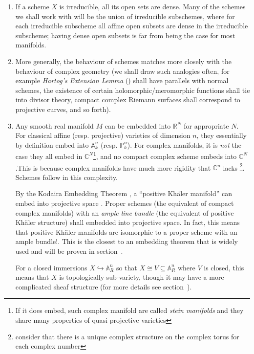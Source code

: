 \documentclass{article}
\newcommand{\A}{{\mathbb{A}}}
\newcommand{\C}{{\mathbb{C}}}
\newcommand{\R}{{\mathbb{R}}}
\renewcommand{\P}{{\mathbb{P}}}
\newcommand{\sse}{\subseteq}
\begin{document}
\begin{enumerate}
			would always be finite! However, there will still be a meaningful way to create the topology on
			$\A_k^n$ via $\A_k^1$ by taking the \emph{fibered product}
	\item If a scheme $X$ is irreducible, all its open sets are dense. Many of the schemes we shall work with
		will be the union of irreducible subschemes, where for each irreducible subscheme all affine open subsets are dense
		in the irreducible subscheme; having dense open subsets is far from being the case for most manifolds.
	\item More generally, the behaviour of schemes matches more closely with the behaviour of complex geometry
		(we shall draw such analogies often, for example \emph{Hartog's Extension Lemma}
		(\cite[chapter~8]{NateComplexAnalysis}) shall have parallels with normal schemes, the existence of certain
		holomorphic/meromorphic functions shall tie into divisor theory, compact complex Riemann surfaces
		shall correspond to projective curves, and so forth).
	\item Any smooth real manifold $M$ can be embedded into $\R^N$ for appropriate $N$. For classical affine (resp.
		projective) varieties of dimension $n$, they essentially by definition embed into $\A_k^n$ (resp.
		$\P_k^n$). For complex manifolds, it is \emph{not} the case they all embed in $\C^N$\footnote{If it
			does embed, such complex manifold are called \emph{stein manifolds} and they share many properties
		of quasi-projective varieties}, and no compact complex scheme embeds into $\C^N$.This is because
		complex manifolds have much more rigidity that $\C^n$ lacks \cite{NateHodge}\footnote{consider
		that there is a unique complex structure on the complex torus for each complex number}. Schemes
		follow in this complexity.

		By the Kodaira Embedding Theorem \cite{NateHodge}, a ``positive Kh\"aler manifold'' can embed into projective
		space . Proper schemes (the equivalent of compact complex manifolds) with an \emph{ample line bundle}
		(the equivalent of positive Kh\"aler structure) shall embedded into projective space. In fact, this
		means that positive Kh\"aler manifolds are isomorphic to a proper scheme with an ample bundle!. This is the closest
		to an embedding theorem that is widely used and will be proven in section~\cite[Maps to Projective Schemes]{NateAlgGeo}.

		For a closed immersions $X \hookrightarrow \A_R^n$ so that $X\cong V \sse \A_R^n$ where $V$ is closed,
		this means that $X$ is topologically sub-variety, though it may have a more complicated sheaf
		structure (for more details see section~\cite[Varieties]{NateAlgGeo}).


\end{enumerate}
\end{document}
